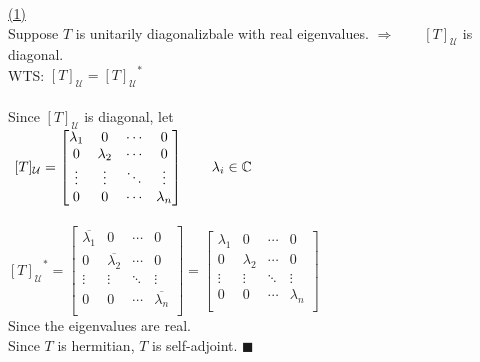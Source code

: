 \documentclass[12pt]{article}
\newcommand{\C}{\mathbb{C}}
\newcommand{\bigInnerproduct}[2]{\big\langle #1, \ #2\big\rangle}
\renewcommand{\qed}{\hfill$\blacksquare$}
\begin{document}
\hyperlink{toc}{\hypertarget{2.1}{(1)}}\\
Suppose $T$ is unitarily diagonalizbale with real eigenvalues. \qquad $\Longrightarrow \qquad [T]_{\mathcal{U}} $ is diagonal.\\
WTS: %
$\displaystyle [T]_{\mathcal{U}} = {[T]_{\mathcal{U}}}^*$
\\\\
Since $[T]_{\mathcal{U}}$ is diagonal, let \\[2mm]
$\hspace*{1.5mm}\displaystyle [T]_{\mathcal{U}} = \begin{bmatrix}
	\lambda_1 & 0 & \cdots & 0 \\
	0 & \lambda_2  & \cdots & 0 \\
	\vdots & \vdots & \ddots & \vdots \\
	0 & 0 & \cdots & \lambda_n \\
\end{bmatrix} \qquad \lambda_i \in \C$ 
\\\\[2mm]
$\displaystyle {[T]_{\mathcal{U}}}^* = \begin{bmatrix}
	\overline{\lambda_1} & 0 & \cdots & 0 \\
	0 & \overline{\lambda_2}  & \cdots & 0 \\
	\vdots & \vdots & \ddots & \vdots \\
	0 & 0 & \cdots & \overline{\lambda_n} \\
\end{bmatrix} = \begin{bmatrix}
	\lambda_1 & 0 & \cdots & 0 \\
	0 & \lambda_2  & \cdots & 0 \\
	\vdots & \vdots & \ddots & \vdots \\
	0 & 0 & \cdots & \lambda_n \\
\end{bmatrix}$\\[2mm]
Since the eigenvalues are real.\\
Since $T$ is hermitian, $T$ is self-adjoint. \qed
\\\\\\[30mm]
\end{document}
